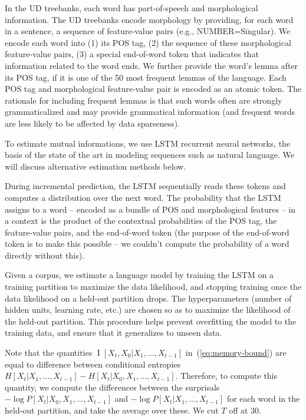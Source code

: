 \documentclass[11pt,letterpaper]{article}
\begin{document}
In the UD treebanks, each word has part-of-speech and morphological information.
The UD treebanks encode morphology by providing, for each word in a sentence, a sequence of feature-value pairs (e.g., NUMBER=Singular).
We encode each word into (1) its POS tag, (2) the sequence of these morphological feature-value pairs, (3) a special end-of-word token that indicates that information related to the word ends.
We further provide the word's lemma after its POS tag, if it is one of the 50 most frequent lemmas of the language.
Each POS tag and morphological feature-value pair is encoded as an atomic token.
The rationale for including frequent lemmas is that such words often are strongly grammaticalized and may provide grammatical information (and frequent words are less likely to be affected by data sparseness).


To estimate mutual informations, we use LSTM recurrent neural networks, the basis of the state of the art in modeling sequences such as natural language.
We will discuss alternative estimation methods below.

During incremental prediction, the LSTM sequentially reads these tokens and computes a distribution over the next word.
The probability that the LSTM assigns to a word -- encoded as a bundle of POS and morphological features -- in a context is the product of the contextual probabilities of the POS tag, the feature-value pairs, and the end-of-word token (the purpose of the end-of-word token is to make this possible -- we couldn't compute the probability of a word directly without this).


Given a corpus, we estimate a language model by training the LSTM on a training partition to maximize the data likelihood, and stopping training once the data likelihood on a held-out partition drops.
The hyperparameters (number of hidden units, learning rate, etc.) are chosen so as to maximize the likelihood of the held-out partition.
This procedure helps prevent overfitting the model to the training data, and ensure that it generalizes to unseen data. 

Note that the quantities $\operatorname{I}[X_t, X_0 | X_1, ..., X_{t-1}]$ in~(\ref{eq:memory-bound}) are equal to difference between conditional entropies $H[X_t|X_1, ..., X_{t-1}] - H[X_t|X_0, X_1, ..., X_{t-1}]$.
Therefore, to compute this quantity, we compute the differences between the surprisals
$-\log P[X_t | X_0, X_1, ..., X_{t-1}]$ and $-\log P[X_t | X_1, ..., X_{t-1}]$ for each word in the held-out partition, and take the average over these.
We cut $T$ off at 30.
\end{document}
